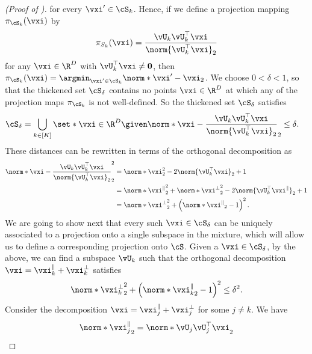 \documentclass[../../book-main.tex]{subfiles}
\begin{document}
\begin{proof}[(Proof of )]
    for every $\vxi' \in \cS_k$.
    Hence, if we define a projection mapping
    $\pi_{\cS_k}(\vxi)$
    by
    \begin{equation}
        \pi_{S_k}(\vxi) = \frac{\vU_k\vU_k^\top \vxi}{\norm{\vU_k^\top \vxi}_2}
    \end{equation}
    for any $\vxi \in \R^D$ with $\vU_k^\top \vxi \neq \mathbf{0}$, then 
    $\pi_{\cS_k}(\vxi) = \argmin_{\vxi' \in \cS_k}\norm*{\vxi' - \vxi}_2$.
    We choose $0 < \delta < 1$, so that the thickened set $\cS_{\delta}$
    contains no points $\vxi \in \R^D$ at which any of the projection maps
    $\pi_{\cS_k}$ is not well-defined.
    So the thickened set $\cS_{\delta}$ satisfies
    \begin{align}
        \cS_{\delta} 
        &= \bigcup_{k \in [K]} \set*{\vxi \in \R^D \given 
        \norm*{\vxi - \frac{\vU_k\vU_k^\top \vxi}{\norm{\vU_k^\top \vxi}_2}}_2
        \leq \delta}.
    \end{align}
    These distances can be rewritten in terms of the orthogonal decomposition as 
    \begin{align}
        \norm*{\vxi - \frac{\vU_k\vU_k^\top \vxi}{\norm{\vU_k^\top \vxi}_2}}_2^2
        &=
        \norm*{\vxi}_2^2 - 2 \norm{\vU_k^\top \vxi}_2 + 1
        \\
        &=
        \norm*{\vxi^{\|}}_2^2 
        + \norm*{\vxi^{\perp}}_2^2
        - 2 \norm{\vU_k^\top \vxi^{\|}}_2 + 1
        \\
        &=
        \norm*{\vxi^{\perp}}_2^2
        + \left( \norm*{\vxi^{\|}}_2 - 1 \right)^2.
        \label{eq:distance-to-hypersphere}
    \end{align}
    We are going to show next that every such $\vxi \in \cS_{\delta}$ can be
    uniquely associated to a projection onto a single subspace in the mixture,
    which will allow us to define a corresponding projection onto $\cS$.
    Given a $\vxi \in \cS_{\delta}$, by the above, we can find a subspace
    $\vU_k$ such that the orthogonal decomposition $\vxi = \vxi^{\|}_k
    + \vxi^{\perp}_k$ satisfies
    \begin{equation}
        \norm*{\vxi^{\perp}_k}_2^2
        + \left( \norm*{\vxi^{\|}_k}_2 - 1 \right)^2
        \leq
        \delta^2.
    \end{equation}
    Consider the decomposition $\vxi = \vxi_j^{\|} + \vxi_j^{\perp}$ for some $j
    \neq k$. We have
    \begin{align}
        \norm*{\vxi_j^{\|}}_2
        =
        \norm*{
            \vU_j \vU_j^\top \vxi 
        }_2

\end{align}
\end{proof}
\end{document}
